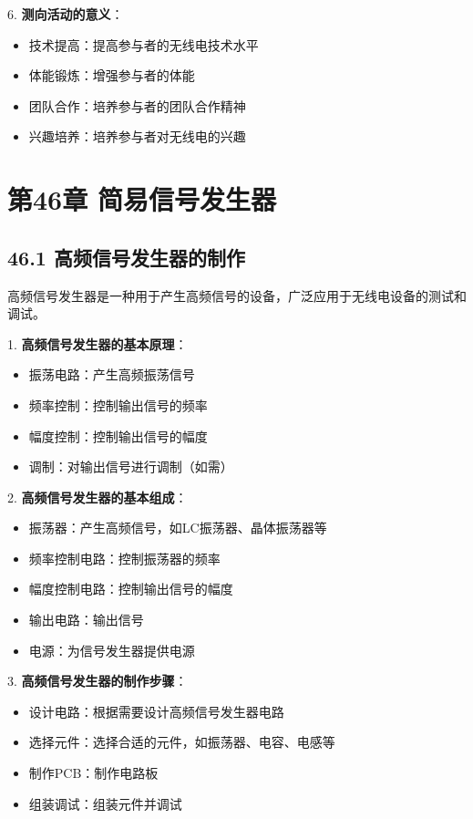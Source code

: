 \documentclass[12pt,UTF8]{ctexbook}
\begin{document}
6. \textbf{测向活动的意义}：
   \begin{itemize}[leftmargin=3.5em]
   \item 技术提高：提高参与者的无线电技术水平
   \item 体能锻炼：增强参与者的体能
   \item 团队合作：培养参与者的团队合作精神
   \item 兴趣培养：培养参与者对无线电的兴趣
   \end{itemize}

\chapter*{第46章 简易信号发生器}
\section*{46.1 高频信号发生器的制作}

高频信号发生器是一种用于产生高频信号的设备，广泛应用于无线电设备的测试和调试。

1. \textbf{高频信号发生器的基本原理}：
   \begin{itemize}[leftmargin=3.5em]
   \item 振荡电路：产生高频振荡信号
   \item 频率控制：控制输出信号的频率
   \item 幅度控制：控制输出信号的幅度
   \item 调制：对输出信号进行调制（如需）
   \end{itemize}

2. \textbf{高频信号发生器的基本组成}：
   \begin{itemize}[leftmargin=3.5em]
   \item 振荡器：产生高频信号，如LC振荡器、晶体振荡器等
   \item 频率控制电路：控制振荡器的频率
   \item 幅度控制电路：控制输出信号的幅度
   \item 输出电路：输出信号
   \item 电源：为信号发生器提供电源
   \end{itemize}

3. \textbf{高频信号发生器的制作步骤}：
   \begin{itemize}[leftmargin=3.5em]
   \item 设计电路：根据需要设计高频信号发生器电路
   \item 选择元件：选择合适的元件，如振荡器、电容、电感等
   \item 制作PCB：制作电路板
   \item 组装调试：组装元件并调试
   \end{itemize}
\end{document}
